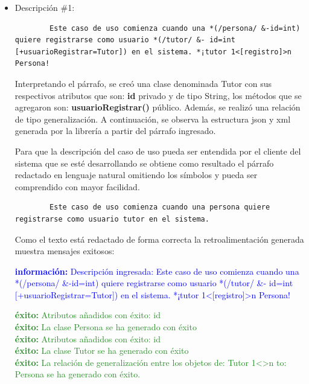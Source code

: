 \sloppy
\begin{itemize}
	\item Descripción \#1:
	\begin{lstlisting} 
		Este caso de uso comienza cuando una *(/persona/ &-id=int) quiere registrarse como usuario *(/tutor/ &- id=int [+usuarioRegistrar=Tutor]) en el sistema. *¡tutor 1<[registro]>n Persona! \end{lstlisting}

	Interpretando el párrafo, se creó una clase denominada Tutor con sus respectivos atributos que son: \textbf{id} privado y de tipo String, los métodos que se agregaron son: \textbf{usuarioRegistrar()} público. Además, se realizó una relación de tipo generalización. A continuación, se observa la estructura json y xml generada por la librería a partir del párrafo ingresado.




Para que la descripción del caso de uso pueda ser entendida por el cliente del sistema que se esté desarrollando se obtiene como resultado el párrafo redactado en lenguaje natural omitiendo los símbolos y pueda ser comprendido con mayor facilidad.

	\begin{lstlisting}
		Este caso de uso comienza cuando una persona quiere registrarse como usuario tutor en el sistema.  \end{lstlisting}
	
	Como el texto está redactado de forma correcta la retroalimentación generada muestra mensajes exitosos:
	
	\textcolor{blue}{\textbf{información:} Descripción ingresada: Este caso de uso comienza cuando una *(/persona/ \&-id=int) quiere registrarse como usuario *(/tutor/ \&- id=int [+usuarioRegistrar=Tutor]) en el sistema. *¡tutor 1<[registro]>n Persona!}
	
	\textcolor{ForestGreen}{
		\textbf{éxito:} Atributos añadidos con éxito: id \\
		\textbf{éxito:} La clase Persona se ha generado con éxito \\
		\textbf{éxito:} Atributos añadidos con éxito: id \\
		\textbf{éxito:} La clase Tutor se ha generado con éxito \\
		\textbf{éxito:} La relación de generalización entre los objetos de: Tutor 1<>n to: Persona se ha generado con éxito. }
	

\end{itemize}
